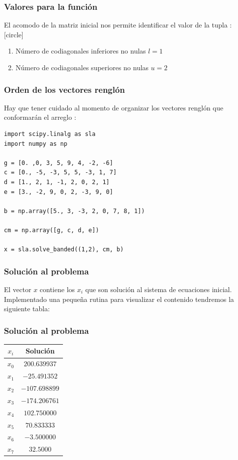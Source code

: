 \begin{frame}
\frametitle{Valores para la función}
El acomodo de la matriz inicial nos permite identificar el valor de la tupla :
[circle]
\begin{enumerate}[<+->]
\item Número de codiagonales inferiores no nulas $l =  1$
\item Número de codiagonales superiores no nulas $u = 2$
\end{enumerate}
\end{frame}
\begin{frame}
\frametitle{Orden de los vectores renglón}
Hay que tener cuidado al momento de organizar los vectores renglón que conformarán el arreglo :
\begin{lstlisting}[caption=Definición de los vectores renglón, basicstyle=\linespread{1.1}\ttfamily=\small, columns=fullflexible]
import scipy.linalg as sla
import numpy as np

g = [0. ,0, 3, 5, 9, 4, -2, -6]
c = [0., -5, -3, 5, 5, -3, 1, 7]
d = [1., 2, 1, -1, 2, 0, 2, 1]
e = [3., -2, 9, 0, 2, -3, 9, 0]

b = np.array([5., 3, -3, 2, 0, 7, 8, 1])

cm = np.array([g, c, d, e])

x = sla.solve_banded((1,2), cm, b)
\end{lstlisting}
\end{frame}
\begin{frame}
\frametitle{Solución al problema}
El vector $x$ contiene los $x_{i}$ que son solución al sistema de ecuaciones inicial.
\\
\bigskip
Implementado una pequeña rutina para visualizar el contenido tendremos la siguiente tabla:
\end{frame}
\begin{frame}
\frametitle{Solución al problema}
\fontsize{12}{12}\selectfont
\begin{table}
\begin{tabular}{c c}
$x_{i}$ & Solución \\ \hline
$x_{0}$ & $200.639937$ \\ \hline
$x_{1}$ & $-25.491352$ \\ \hline
$x_{2}$ & $-107.698899$ \\ \hline
$x_{3}$ & $-174.206761$ \\ \hline
$x_{4}$ & $102.750000$ \\ \hline
$x_{5}$ & $70.833333$ \\ \hline
$x_{6}$ & $-3.500000$ \\ \hline
$x_{7}$ & $32.5000$ \\
\end{tabular}
\end{table}
\end{frame}
